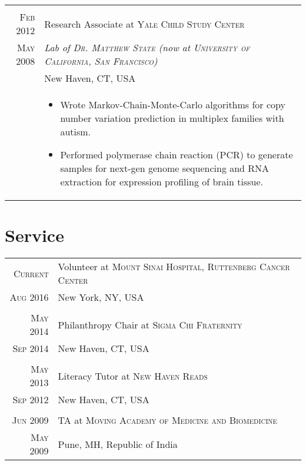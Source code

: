 \documentclass[a4paper,10pt]{article}
\begin{document}
\begin{longtable}{r|p{11cm}}
 \multicolumn{2}{c}{} \\
 \nopagebreak \textsc{Feb 2012} & Research Associate at \textsc{Yale Child Study Center} \\
 \nopagebreak \textsc{May 2008} & \small\emph{Lab of \textsc{Dr. Matthew State} (now at \textsc{University of California, San Francisco})} \\
 \nopagebreak & \small{New Haven, CT, USA} \\
 \nopagebreak & \footnotesize{
	\begin{itemize}
		\item[]{
			Wrote Markov-Chain-Monte-Carlo algorithms for copy number variation prediction
			in multiplex families with autism.
		}
		\item[]{
			Performed polymerase chain reaction (PCR) to generate samples for next-gen
			genome sequencing and RNA extraction for expression profiling of
			brain tissue.
		}
	\end{itemize}
   }\\
\end{longtable}

\section{Service}
\begin{longtable}{r|p{11cm}}
 \nopagebreak \textsc{Current} & Volunteer at \textsc{Mount Sinai Hospital, Ruttenberg Cancer Center} \\
 \nopagebreak \textsc{Aug 2016} &  \small{New York, NY, USA}\\
 \multicolumn{2}{c}{} \\
 \nopagebreak \textsc{May 2014} & Philanthropy Chair at \textsc{Sigma Chi Fraternity}\\
 \nopagebreak \textsc{Sep 2014} & \small{New Haven, CT, USA} \\
 \multicolumn{2}{c}{} \\
 \nopagebreak \textsc{May 2013} & Literacy Tutor at \textsc{New Haven Reads}\\
 \nopagebreak \textsc{Sep 2012} & \small{New Haven, CT, USA} \\
 \multicolumn{2}{c}{} \\
 \nopagebreak \textsc{Jun 2009} & TA at \textsc{Moving Academy of Medicine and Biomedicine} \\
 \nopagebreak \textsc{May 2009} & \small{Pune, MH, Republic of India} \\
\end{longtable}
\end{document}
